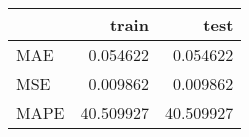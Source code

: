 \begin{tabular}{lrr}
\toprule
{} &      train &       test \\
\midrule
MAE  &   0.054622 &   0.054622 \\
MSE  &   0.009862 &   0.009862 \\
MAPE &  40.509927 &  40.509927 \\
\bottomrule
\end{tabular}
